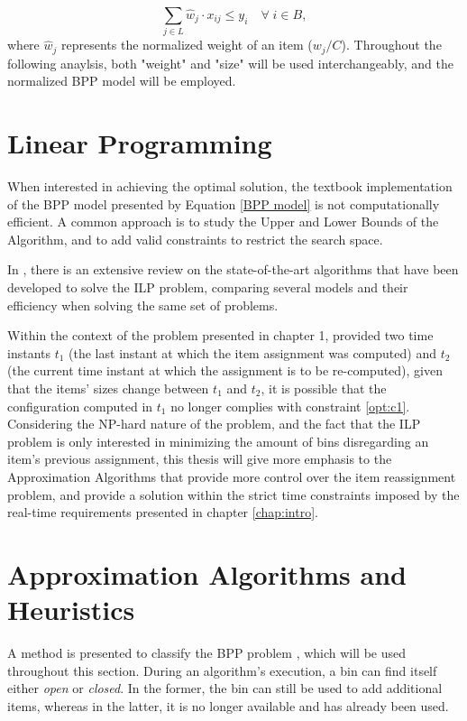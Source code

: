 \begin{equation}
    \sum_{j \in L} \hat w_j \cdot x_{ij} \leq y_i \quad \forall \; i \in B,
\end{equation}
where \(\hat w_j\) represents the normalized weight of an item ($w_j/C$).
Throughout the following anaylsis, both "weight" and "size" will be used
interchangeably, and the normalized BPP model will be employed.

\section{Linear Programming}

When interested in achieving the optimal solution, the textbook implementation
of the BPP model presented by Equation \ref{BPP model} is not computationally
efficient. A common approach is to study the Upper and Lower Bounds of the
Algorithm, and to add valid constraints to restrict the search space.

In \cite{delorme2016bin}, there is an extensive review on the state-of-the-art
algorithms that have been developed to solve the ILP problem, comparing several
models and their efficiency when solving the same set of problems. 

Within the context of the problem presented in chapter 1, provided two time
instants $t_1$ (the last instant at which the item assignment was computed) and
$t_2$ (the current time instant at which the assignment is to be re-computed),
given that the items' sizes change between $t_1$ and $t_2$, it is possible that
the configuration computed in $t_1$ no longer complies with constraint
\ref{opt:c1}. Considering the NP-hard nature of the problem, and the fact that the
ILP problem is only interested in minimizing the amount of bins disregarding an
item's previous assignment, this thesis will give more emphasis to the
Approximation Algorithms that provide more control over the item reassignment
problem, and provide a solution within the strict time constraints imposed by
the real-time requirements presented in chapter \ref{chap:intro}.

\section{Approximation Algorithms and Heuristics}
\label{section:AA}

A method is presented to classify the BPP problem \cite{coffman2013bin}, which
will be used throughout this section. During an algorithm's execution, a bin can
find itself either \textit{open} or \textit{closed}. In the former, the bin can
still be used to add additional items, whereas in the latter, it is no longer
available and has already been used.  

